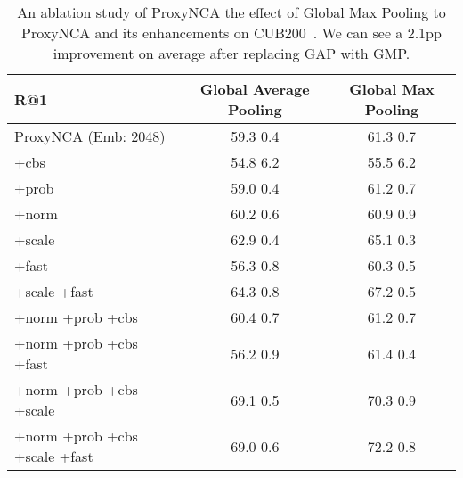 \documentclass[runningheads]{llncs}
\begin{document}
\begin{table}[hb]
\centering
\caption{An ablation study of ProxyNCA the effect of Global Max Pooling to ProxyNCA and its enhancements on CUB200~\cite{wah2011caltech}. We can see a 2.1pp improvement on average after replacing GAP with GMP. }
\setlength{\tabcolsep}{3pt}
\begin{tabular}{|l|c|c|}
\hline
R@1 & Global Average Pooling & Global Max Pooling  \\ \hline
\small{ProxyNCA (Emb: 2048)}& 59.3  0.4 & 61.3  0.7\\
\hspace{0.3cm}\small{+cbs}& 54.8  6.2 & 55.5  6.2  \\
\hspace{0.3cm}\small{+prob} & 59.0  0.4 & 61.2  0.7 \\
\hspace{0.3cm}\small{+norm} & 60.2  0.6 & 60.9  0.9 \\
\hspace{0.3cm}\small{+scale}& 62.9  0.4 & 65.1  0.3\\
\hspace{0.3cm}\small{+fast} & 56.3  0.8 & 60.3  0.5 \\
\hspace{0.3cm}\small{+scale +fast} & 64.3  0.8 & 67.2   0.5\\
\hspace{0.3cm}\small{+norm +prob +cbs} & 60.4  0.7 & 61.2   0.7\\
\hspace{0.3cm}\small{+norm +prob +cbs +fast} & 56.2  0.9 & 61.4  0.4  \\
\hspace{0.3cm}\small{+norm +prob +cbs +scale} & 69.1   0.5 & 70.3  0.9  \\
\hspace{0.3cm}\small{+norm +prob +cbs +scale +fast} & 69.0   0.6 & 72.2  0.8 \\
\hline
\end{tabular}
\label{table:cub_det3}
\end{table}
\end{document}
